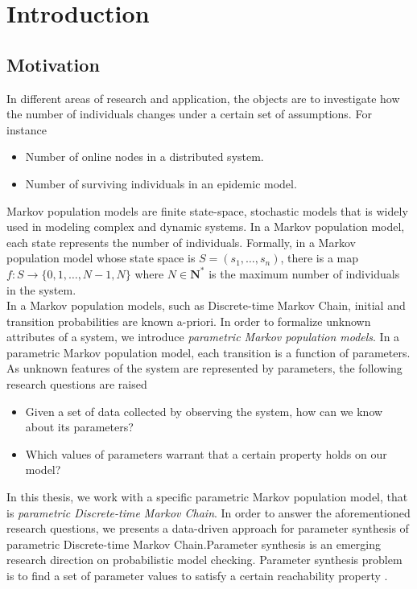 \chapter{Introduction}
\section{Motivation}

In different areas of research and application, the objects are to investigate how the number of
individuals changes under a certain set of assumptions. For instance
\begin{itemize}
      \item Number of online nodes in a distributed system.
      \item Number of surviving individuals in an epidemic model.
\end{itemize}
Markov population models \cite{kingman1969markov} are finite state-space, stochastic models that is
widely used in modeling complex and dynamic systems. In a Markov population model, each state
represents the number of individuals. Formally, in a Markov population model whose state space is
$S=(s_1,\ldots,s_n)$, there is a map $f:S\rightarrow\{0,1,\ldots,N-1,N\}$ where $N\in\mathbf{N}^*$
is the maximum number of individuals in the system.\\
In a Markov population models, such as Discrete-time Markov Chain, initial and transition
probabilities are known a-priori. In order to formalize unknown attributes of a system, we introduce
\textit{parametric Markov population models}. In a parametric Markov population model, each
transition is a function of parameters. As unknown features of the system are represented by
parameters, the following research questions are raised
\begin{itemize}
      \item Given a set of data collected by observing the system, how can we know about its
      parameters?
      \item Which values of parameters warrant that a certain property holds on our model?
\end{itemize}
In this thesis, we work with a specific parametric Markov population model, that is
\textit{parametric Discrete-time Markov Chain}. In order to answer the aforementioned research
questions, we presents a data-driven approach for parameter synthesis of parametric Discrete-time
Markov Chain.Parameter synthesis is an emerging research direction on probabilistic model checking.
Parameter synthesis problem is to find a set of parameter values to satisfy a certain reachability
property \cite{katoen2016probabilistic}.

